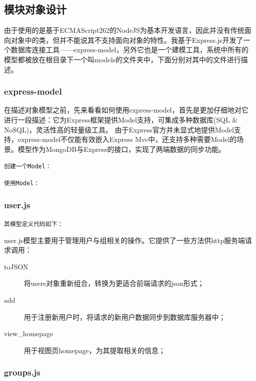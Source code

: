 
\subsection{模块对象设计}
由于使用的是基于ECMAScript262的NodeJS为基本开发语言，因此并没有传统面向对象中的类，但并不能说其不支持面向对象的特性。我基于Express.js开发了一个数据库连接工具——express-model，另外它也是一个建模工具，系统中所有的模型都被放在根目录下一个叫models的文件夹中，下面分别对其中的文件进行描述。

\subsubsection{express-model}
在描述对象模型之前，先来看看如何使用express-model，首先是更加仔细地对它进行一段描述：它为Express框架提供Model支持，可集成多种数据库(SQL \& NoSQL)，灵活性高的轻量级工具。 由于Express官方并未显式地提供Model支持，express-model不仅能有效嵌入Express Mvc中，还支持多种需要Model的场景。模型作为MongoDB与Express的接口，实现了两端数据的同步功能。
\par

\noindent
\texttt{\large 创建一个Model：}


\noindent
\texttt{\large 使用Model：}


\subsubsection{user.js}

\noindent
\texttt{\large 其模型定义代码如下：}


\noindent
user.js模型主要用于管理用户与组相关的操作。它提供了一些方法供http服务端请求调用：

\begin{description}
	\item[toJSON] 将users对象重新组合，转换为更适合前端请求的json形式；
	\item[add] 用于注册新用户时，将请求的新用户数据同步到数据库服务器中；
	\item[view\_homepage] 用于视图页homepage，为其提取相关的信息；
\end{description}

\subsubsection{groups.js}

